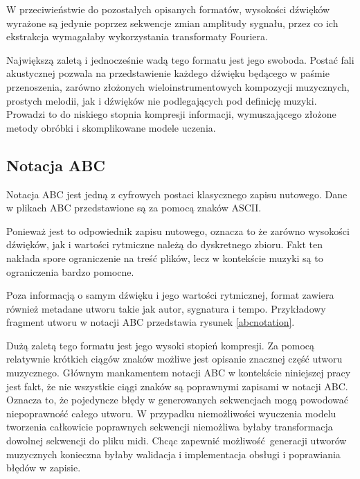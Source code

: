 {{{            W przeciwieństwie do pozostałych opisanych formatów, wysokości dźwięków wyrażone są 
            jedynie poprzez sekwencje zmian amplitudy sygnału, przez co
            ich ekstrakcja wymagałaby wykorzystania transformaty Fouriera.

            Największą zaletą i jednocześnie wadą tego formatu jest jego swoboda. 
            Postać fali akustycznej pozwala na przedstawienie każdego dźwięku będącego w paśmie
            przenoszenia, zarówno złożonych wieloinstrumentowych kompozycji muzycznych, 
            prostych melodii, jak i dźwięków nie podlegających pod definicję muzyki. 
            Prowadzi to do niskiego stopnia kompresji informacji, wymuszającego złożone metody obróbki i skomplikowane
            modele uczenia.
        }

        \subsection{Notacja ABC}\label{chap:abc}
        {
            Notacja ABC jest jedną z cyfrowych postaci klasycznego zapisu nutowego.
            Dane w plikach ABC przedstawione są za pomocą znaków ASCII.

            Ponieważ jest to odpowiednik zapisu nutowego, oznacza to
            że zarówno wysokości dźwięków, jak i wartości rytmiczne należą do dyskretnego zbioru.
            Fakt ten nakłada spore ograniczenie na treść plików, lecz w kontekście muzyki są to 
            ograniczenia bardzo pomocne.

            Poza informacją o samym dźwięku i jego wartości rytmicznej, format zawiera również metadane
            utworu takie jak autor, sygnatura i tempo. Przykładowy fragment utworu w notacji ABC przedstawia
            rysunek \ref{abcnotation}.

            

            Dużą zaletą tego formatu jest jego wysoki stopień kompresji. Za pomocą relatywnie krótkich ciągów
            znaków możliwe jest opisanie znacznej część utworu muzycznego. Głównym mankamentem notacji ABC
            w kontekście niniejszej pracy jest fakt, że nie wszystkie ciągi znaków są poprawnymi zapisami 
            w notacji ABC. Oznacza to, że pojedyncze błędy w generowanych sekwencjach mogą powodować niepoprawność całego utworu.
            W przypadku niemożliwości wyuczenia modelu tworzenia całkowicie poprawnych sekwencji niemożliwa byłaby
            transformacja dowolnej sekwencji do pliku midi. Chcąc zapewnić możliwość generacji utworów muzycznych
            konieczna byłaby walidacja i implementacja obsługi i poprawiania błędów w zapisie.
        }

}}
